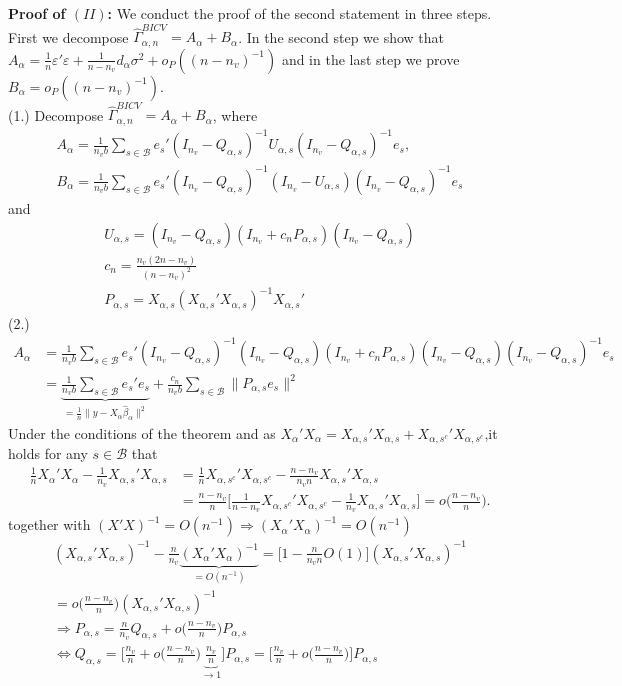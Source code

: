\documentclass[Research_Module_ES.tex]{subfiles}
\begin{document}
\textbf{Proof of $(II)$:} 
We conduct the proof of the second statement in three steps. First we decompose $\hat{\Gamma}_{\alpha,n}^{BICV} = A_\alpha + B_\alpha$. In the second step we show that $A_\alpha=\frac{1}{n}\varepsilon'\varepsilon + \frac{1}{n-n_v}d_\alpha\sigma^2 + o_P((n-n_v)^{-1})$ and in the last step we prove $B_\alpha = o_P((n-n_v)^{-1})$. \\
(1.) Decompose $\hat{\Gamma}_{\alpha,n}^{BICV} = A_\alpha + B_\alpha$, where
\begin{align*}
A_\alpha=\frac{1}{n_vb}\sum_{s\in \mathcal{B}}e_s'(I_{n_v}-Q_{\alpha,s})^{-1}U_{\alpha,s}(I_{n_v}-Q_{\alpha,s})^{-1}e_s,\\
B_\alpha=\frac{1}{n_vb}\sum_{s\in \mathcal{B}}e_s'(I_{n_v}-Q_{\alpha,s})^{-1}(I_{n_v}-U_{\alpha,s})(I_{n_v}-Q_{\alpha,s})^{-1}e_s
\end{align*}
and
\begin{align*}
U_{\alpha,s} = (I_{n_v}-Q_{\alpha,s})(I_{n_v}+c_n P_{\alpha,s})(I_{n_v}-Q_{\alpha,s})\\
c_n = \frac{n_v(2n-n_v)}{(n-n_v)^2}\\
P_{\alpha,s}= X_{\alpha,s}(X_{\alpha,s}'X_{\alpha,s})^{-1}X_{\alpha,s}'
\end{align*}
(2.)
\begin{align*}
A_\alpha&= \frac{1}{n_vb}\sum_{s\in \mathcal{B}}e_s'(I_{n_v}-Q_{\alpha,s})^{-1}(I_{n_v}-Q_{\alpha,s})(I_{n_v}+c_n P_{\alpha,s})(I_{n_v}-Q_{\alpha,s})(I_{n_v}-Q_{\alpha,s})^{-1}e_s\\
&=  \underbrace{\frac{1}{n_vb}\sum_{s\in \mathcal{B}} e_s'e_s}_{=\frac{1}{n}\lVert y-X_\alpha\hat{\beta}_\alpha\rVert^2} + \frac{c_n}{n_vb}\sum_{s\in \mathcal{B}}\lVert P_{\alpha,s}e_s\rVert^2
\end{align*}
Under the conditions of the theorem and as $X_\alpha'X_\alpha =X_{\alpha,s}'X_{\alpha,s}+X_{\alpha,s^c}'X_{\alpha,s^c}$,it holds for any $s\in \mathcal{B}$ that
\begin{align*}
\frac{1}{n}X_\alpha'X_\alpha - \frac{1}{n_v}X_{\alpha,s}'X_{\alpha,s}
&=\frac{1}{n}X_{\alpha,s^c}'X_{\alpha,s^c}-\frac{n-n_v}{n_vn}X_{\alpha,s}'X_{\alpha,s}\\
&= \frac{n-n_v}{n}\biggl[\frac{1}{n-n_v}X_{\alpha,s^c}'X_{\alpha,s^c}-\frac{1}{n_v}X_{\alpha,s}'X_{\alpha,s}\biggr] 
= o\biggl(\frac{n-n_v}{n}\biggr).
\end{align*}
together with $(X'X)^{-1}=O(n^{-1})\Rightarrow (X_\alpha'X_\alpha)^{-1}=O(n^{-1})$ 
\begin{align*}
(X_{\alpha,s}'X_{\alpha,s})^{-1}-\frac{n}{n_v}\underbrace{(X_{\alpha}'X_{\alpha})^{-1}}_{=O(n^{-1})} = \biggl[1-\frac{n}{n_vn}O(1)\biggr](X_{\alpha,s}'X_{\alpha,s})^{-1} \\
= o\biggl(\frac{n-n_v}{n}\biggr)(X_{\alpha,s}'X_{\alpha,s})^{-1}\\
\Rightarrow P_{\alpha,s}=\frac{n}{n_v}Q_{\alpha,s}+o\biggl(\frac{n-n_v}{n}\biggr)P_{\alpha,s}\\
\iff Q_{\alpha,s} = \biggl[\frac{n_v}{n}+o\biggl(\frac{n-n_v}{n}\biggr)\underbrace{\frac{n_v}{n}}_{\to 1}\biggr]P_{\alpha,s}
=\biggl[\frac{n_v}{n}+o\biggl(\frac{n-n_v}{n}\biggr)\biggr]P_{\alpha,s}
\end{align*}
\end{document}
